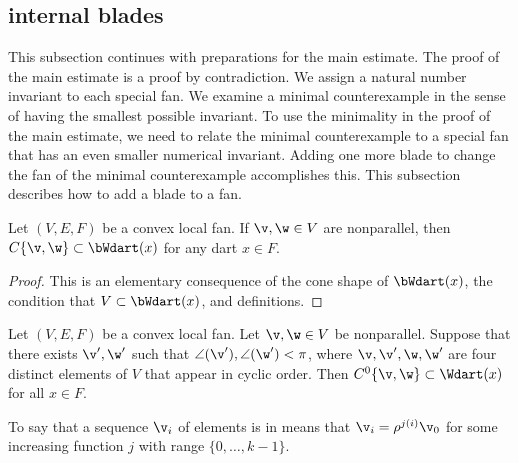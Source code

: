 \subsection{internal blades}

This subsection continues with preparations for the main estimate.
The proof of the main estimate is a proof by contradiction.  We assign
a natural number invariant to each special fan.  We examine a minimal
counterexample in the sense of having the smallest possible invariant.
To use the minimality in the proof of the main estimate, we need to
relate the minimal counterexample to a special fan that has an even
smaller numerical invariant.  Adding one more blade to change the
fan of the minimal counterexample accomplishes this.  This subsection
describes how to add a blade to a fan.



\begin{lemma}[] Let $(V,E,F)$ be a convex local fan.
If $\v,\w\in V$ are nonparallel, then $C\{\v,\w\} \subset
\bWdart(x)$ for any dart $x\in F$.
\end{lemma}
%

\begin{proof} This is an elementary consequence of
the cone shape of $\bWdart(x)$,  the condition that $V\subset
\bWdart(x)$, and definitions.
\end{proof}


\begin{lemma} \label{lemma:internal}
Let $(V,E,F)$ be a convex local fan.  Let $\v,\w\in V$ be nonparallel.
Suppose that there exists $\v',\w'$ such that
$\angle(\v'),\angle(\w')<\pi$, where $\v,\v',\w,\w'$ are four
distinct elements of $V$ that appear in cyclic order.  Then
$C^0\{\v,\w\}\subset \Wdart(x)$ for all $x\in F$.
\end{lemma}
%
%

To say that a sequence $\v_i$ of elements is in  means that $\v_i = \rho^{j (i)}\v_0$ for some increasing
function $j$ with range $\{0,\ldots,k-1\}$.

